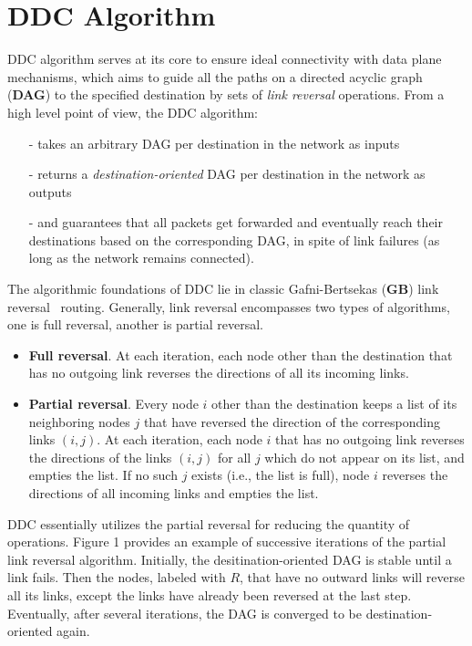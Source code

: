\section{DDC Algorithm}
DDC algorithm serves at its core to ensure ideal connectivity with data plane mechanisms, which aims to guide all the paths on a directed acyclic graph (\textbf{DAG}) to the specified destination by sets of \textit{link reversal} operations. From a high level point of view, the DDC algorithm:
\begin{itemize}
    \item[-] takes an arbitrary DAG per destination in the network as inputs
    \item[-] returns a \textit{destination-oriented} DAG per destination in the network as outputs
    \item[-] and guarantees that all packets get forwarded and eventually reach their destinations based on the corresponding DAG, in spite of link failures (as long as the network remains connected).  
\end{itemize}
The algorithmic foundations of DDC lie in classic Gafni-Bertsekas (\textbf{GB}) link reversal~\cite{GB} routing. Generally, link reversal encompasses two types of algorithms, one is full reversal, another is partial reversal. 
\begin{itemize}
    \item \textbf{Full reversal}. At each iteration, each node other than the destination that has no outgoing link reverses the directions of all its incoming links. 
    \item \textbf{Partial reversal}. Every node $i$ other than the destination keeps a list of its neighboring nodes $j$ that have reversed the direction of the corresponding links $(i, j)$. At each iteration, each node $i$ that has no outgoing link reverses the directions of the links $(i, j)$ for all $j$ which do not appear on its list, and empties the list. If no such $j$ exists (i.e., the list is full), node $i$ reverses the directions of all incoming links and empties the list. 
\end{itemize} 
DDC essentially utilizes the partial reversal for reducing the quantity of operations. Figure 1 provides an example of successive iterations of the partial link reversal algorithm. Initially, the desitination-oriented DAG is stable until a link fails. Then the nodes, labeled with $R$, that have no outward links will reverse all its links, except the links have already been reversed at the last step. Eventually, after several iterations, the DAG is converged to be destination-oriented again.

